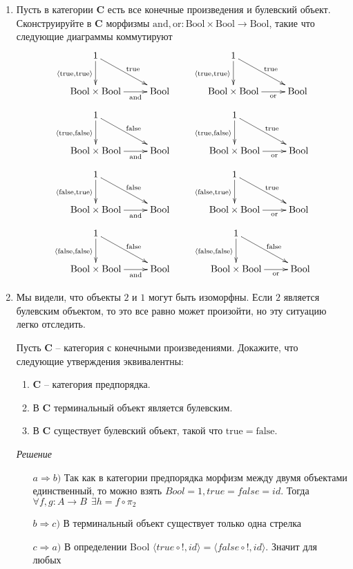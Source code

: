 \documentclass[draft]{article}
\newcommand{\cat}[1]{\mathbf{#1}}
\renewcommand{\C}{\cat{C}}
\newcommand{\bool}{\mathrm{Bool}}
\newcommand{\true}{\mathrm{true}}
\newcommand{\false}{\mathrm{false}}
\newcommand{\andb}{\mathrm{and}}
\newcommand{\orb}{\mathrm{or}}
\begin{document}
\begin{enumerate}
\item Пусть в категории $\C$ есть все конечные произведения и булевский объект.
Сконструируйте в $\C$ морфизмы $\andb, \orb : \bool \times \bool \to \bool$, такие что следующие диаграммы коммутируют
\[ \xymatrix{ 1 \ar[d]_{\langle \true, \true \rangle} \ar[rd]^{\true} \\
              \bool \times \bool \ar[r]_-{\andb} & \bool
            }
\qquad \xymatrix{ 1 \ar[d]_{\langle \true, \true \rangle} \ar[rd]^{\true} \\
              \bool \times \bool \ar[r]_-{\orb} & \bool
            } \]
\[ \xymatrix{ 1 \ar[d]_{\langle \true, \false \rangle} \ar[rd]^{\false} \\
              \bool \times \bool \ar[r]_-{\andb} & \bool
            }
\qquad \xymatrix{ 1 \ar[d]_{\langle \true, \false \rangle} \ar[rd]^{\true} \\
              \bool \times \bool \ar[r]_-{\orb} & \bool
            } \]
\[ \xymatrix{ 1 \ar[d]_{\langle \false, \true \rangle} \ar[rd]^{\false} \\
              \bool \times \bool \ar[r]_-{\andb} & \bool
            }
\qquad \xymatrix{ 1 \ar[d]_{\langle \false, \true \rangle} \ar[rd]^{\true} \\
              \bool \times \bool \ar[r]_-{\orb} & \bool
            } \]
\[ \xymatrix{ 1 \ar[d]_{\langle \false, \false \rangle} \ar[rd]^{\false} \\
              \bool \times \bool \ar[r]_-{\andb} & \bool
            }
\qquad \xymatrix{ 1 \ar[d]_{\langle \false, \false \rangle} \ar[rd]^{\false} \\
              \bool \times \bool \ar[r]_-{\orb} & \bool
            } \]

\item Мы видели, что объекты $2$ и $1$ могут быть изоморфны. Если $2$ является булевским объектом, то это все равно может произойти, но эту ситуацию легко отследить.

Пусть $\C$ -- категория с конечными произведениями.
Докажите, что следующие утверждения эквивалентны:
\begin{enumerate}
\item $\C$ -- категория предпорядка.
\item В $\C$ терминальный объект является булевским.
\item В $\C$ существует булевский объект, такой что $\true = \false$.
\end{enumerate}

\textit{Решение}
\begin{itemize}
\item[$a\Rightarrow b)$] Так как в категории предпорядка морфизм между двумя объектами единственный, то можно взять $Bool = 1, true = false = id$. Тогда $\forall f, g : A \to B ~~\exists h = f \circ \pi_2$
\item[$b\Rightarrow c)$] В терминальный объект существует только одна стрелка
\item[$c\Rightarrow a)$] В определении Bool $\langle true \circ !, id \rangle = \langle false \circ !, id \rangle$. Значит для любых 
\end{itemize}


\end{enumerate}
\end{document}
